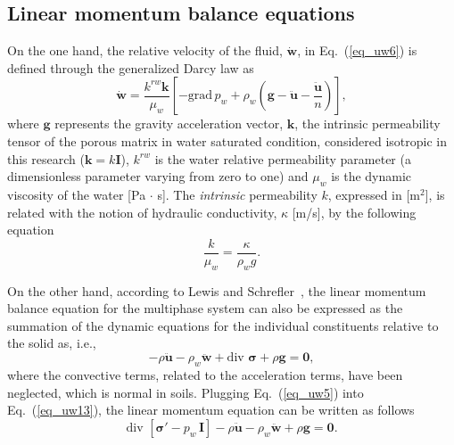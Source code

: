 \documentclass[twocolumn]{svjour3}          %
\begin{document}

\subsection{Linear momentum balance equations}
\label{subsec:22}
On the one hand, the relative velocity of the fluid, %
   $\dot{\boldsymbol{w}}$, in Eq.~(\ref{eq_uw6})  is defined through the generalized Darcy law as~\cite{LewisSchrefler98}
\begin{equation}\label{eq_uw8}
\dot{\boldsymbol{w}}=\frac{k^{rw}\boldsymbol{k}}{\mu_w}\left[ -\mbox{grad} \,p_w + \rho_w(\boldsymbol{g}-\ddot{\boldsymbol{u}}-\frac{\ddot{\boldsymbol{u}}}{n})\right] ,
\end{equation}
where $\boldsymbol{g}$ represents the gravity acceleration vector,  $\boldsymbol{k}$, the intrinsic permeability tensor of the porous matrix in water saturated condition, considered isotropic in this research ($\boldsymbol{k}=k \boldsymbol{I}$), $k^{rw}$ is the water relative permeability parameter (a dimensionless parameter varying from zero to one) and $\mu_w$ is the dynamic viscosity of the water [Pa $\cdot$ s].  The {\it intrinsic}  permeability $k$, expressed in  [m$^{2}$], is related with the  notion of  hydraulic conductivity,  $\kappa$ [m/s],  by the following equation
\begin{equation}\label{eq_uw9}
\frac{k}{\mu_w}=\frac{\kappa}{\rho_w g}.
\end{equation}

On the other hand, according to Lewis and Schrefler~\cite{LewisSchrefler98},   the linear momentum balance equation for the multiphase system  can also be expressed as the summation of the dynamic equations for the individual constituents relative to the solid as, i.e.,
\begin{equation}\label{eq_uw13}
-\rho\ddot{\boldsymbol{u}} - \rho_w\ddot{\boldsymbol{w}} + \mbox{div } \boldsymbol{\sigma}+\rho\boldsymbol{g}=\boldsymbol{0},
\end{equation}
where the convective terms, related to the acceleration terms, have been neglected, which is normal in soils. Plugging Eq.~(\ref{eq_uw5}) into Eq.~(\ref{eq_uw13}), the linear momentum equation can be written as follows
\begin{equation}\label{eq_uw14}
\mbox{div }\left[ \boldsymbol{ \sigma'} - p_{w} \, \textbf{I} \right]-\rho\boldsymbol{\ddot{u}}-\rho_w\boldsymbol{\ddot{w}}+\rho\boldsymbol{g}=\boldsymbol{0}.
\end{equation}
\end{document}
